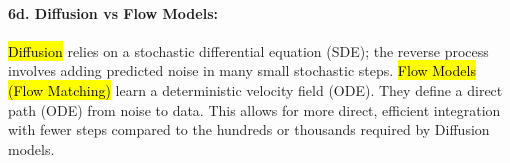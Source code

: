 \documentclass[11pt]{article}
\begin{document}
\paragraph{6d. Diffusion vs Flow Models:}
\hl{Diffusion} relies on a stochastic differential equation (SDE); the reverse process involves adding predicted noise in many small stochastic steps. 
\hl{Flow Models (Flow Matching)} learn a deterministic velocity field (ODE). They define a direct path (ODE) from noise to data. This allows for more direct, efficient integration with fewer steps compared to the hundreds or thousands required by Diffusion models.
\end{document}
